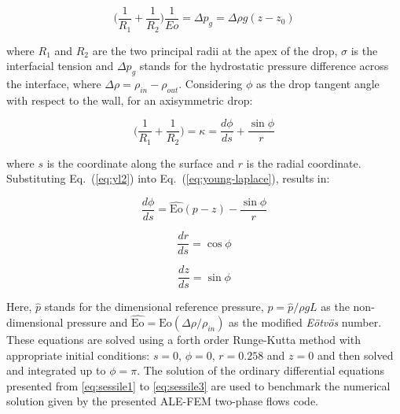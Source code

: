 \documentclass{wccm2014}
\newcommand{\Eo}{\mathrm{Eo}}
\begin{document}
\begin{equation}
	\big( \frac{1}{R_1}+\frac{1}{R_2} \big)\frac{1}{Eo}
	=
	\Delta p_g
	=
	\Delta \rho g (z-z_0)
	\label{eq:young-laplace}
\end{equation}

\noindent where $R_1$ and $R_2$ are the two principal radii at the apex
of the drop, $\sigma$ is the interfacial tension and $\Delta p_g$ stands
for the hydrostatic pressure difference across the interface, where
$\Delta \rho = \rho_{in}-\rho_{out}$. Considering $\phi$ as the drop
tangent angle with respect to the wall, for an axisymmetric drop:

\begin{equation}
	\big( \frac{1}{R_1}+\frac{1}{R_2} \big)
	=
	\kappa 
	= 
	\frac{d\phi}{ds} + \frac{\sin \phi}{r} 
	\label{eq:yl2}
\end{equation}

\noindent where $s$ is the coordinate along the surface and $r$ is
the radial coordinate. Substituting Eq.~(\ref{eq:yl2}) into 
Eq.~(\ref{eq:young-laplace}), results in:

\begin{equation}
	\frac{d \phi}{ds} = 
	\hat{\Eo}(p-z) - \frac{\sin \phi}{r}
	\label{eq:sessile1}
\end{equation}

\begin{equation}
	\frac{dr}{ds} = \cos \phi
	\label{eq:sessile2}
\end{equation}

\begin{equation}
	\frac{dz}{ds} = \sin \phi
	\label{eq:sessile3}
\end{equation}

\noindent Here, $\hat{p}$ stands for the dimensional reference pressure,
$p=\hat{p}/\rho g L$ as the non-dimensional pressure and $\hat
{\Eo}=\Eo(\Delta \rho/\rho_{in})$ as the modified \textit{E\"otv\"os}
number. These equations are solved using a forth order Runge-Kutta method with
appropriate initial conditions: $s=0$, $\phi=0$, $r=0.258$ and $z=0$ and
then solved and integrated up to $\phi=\pi$. The solution of the
ordinary differential equations presented from \ref{eq:sessile1} to
\ref{eq:sessile3} are used to benchmark the numerical solution given by
the presented ALE-FEM two-phase flows code.

% 
\end{document}
